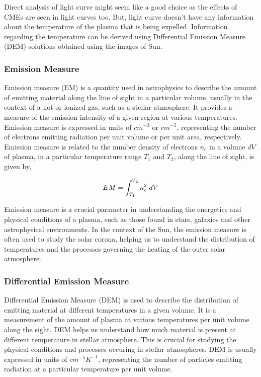 Direct analysis of light curve might seem like a good choice as the effects of CMEs are seen in light curves too. But, light curve doesn't have any information about the temperature of the plasma that is being expelled. Information regarding the temperature can be derived using Differential Emission Measure (DEM) solutions obtained using the images of Sun.

\subsubsection{Emission Measure}

Emission measure (EM) is a quantity used in astrophysics to describe the amount of emitting material along the line of sight in a particular volume, usually in the context of a hot or ionized gas, such as a stellar atmosphere. It provides a measure of the emission intensity of a given region at various temperatures. Emission measure is expressed in units of $cm^{-3}$ or $cm^{-5}$, representing the number of electrons  emitting radiation per unit volume or per unit area, respectively.\\

Emission measure is related to the number density of electrons $n_e$ in a volume $dV$ of plasma, in a particular temperature range $T_1$ and $T_2$, along the line of sight, is given by,

\vspace{-0.75cm}
\begin{center}
    \begin{equation}
        EM = \int_{T_1}^{T_2} n_e^2 \hspace{0.1cm} dV
    \end{equation}
\end{center}

Emission measure is a crucial parameter in understanding the energetics and physical conditions of a plasma, such as those found in stars, galaxies and other astrophysical environments. In the context of the Sun, the emission measure is often used to study the solar corona, helping us to understand the distribution of temperatures and the processes governing the heating of the outer solar atmosphere.

\subsubsection{Differential Emission Measure}

Differential Emission Measure (DEM) is used to describe the distribution of emitting material at different temperatures in a given volume. It is a measurement of the amount of plasma at various temperatures per unit volume along the sight. DEM helps us understand how much material is present at different temperature in stellar atmosphere. This is crucial for studying the physical conditions and processes occuring in stellar atmospheres. DEM is usually expressed in units of $cm^{-5}K^{-1}$, representing the number of particles emitting radiation at a particular temperature per unit volume.

